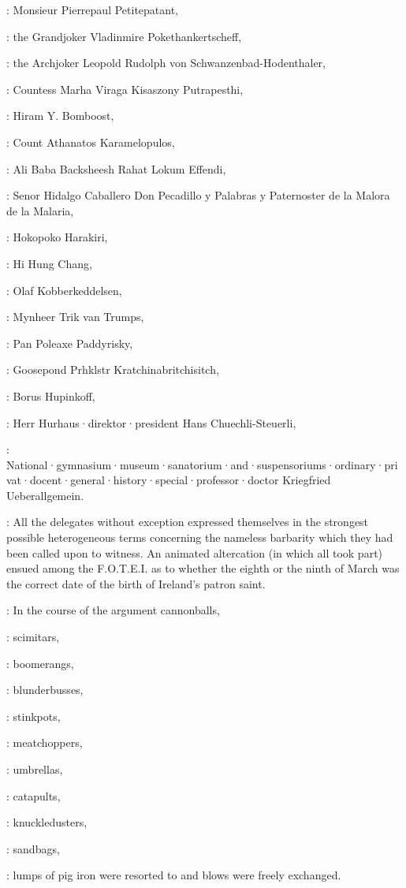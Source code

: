 :
Monsieur Pierrepaul Petitepatant,

:
the Grandjoker Vladinmire Pokethankertscheff,

:
the Archjoker Leopold Rudolph von Schwanzenbad-Hodenthaler,

:
Countess Marha Viraga Kisaszony Putrapesthi,

:
Hiram Y.
Bomboost,

:
Count Athanatos Karamelopulos,

:
Ali Baba Backsheesh Rahat Lokum Effendi,


:
Senor Hidalgo Caballero Don Pecadillo y Palabras y Paternoster de la Malora de la Malaria,


:
Hokopoko Harakiri,


:
Hi Hung Chang,


:
Olaf Kobberkeddelsen,


:
Mynheer Trik van Trumps,


:
Pan Poleaxe Paddyrisky,


:
Goosepond Prhklstr Kratchinabritchisitch,


:
Borus Hupinkoff,


:
Herr Hurhaus·direktor·president Hans Chuechli-Steuerli,


:
National·gymnasium·museum·sanatorium·and·suspensoriums·ordinary·privat·docent·general·history·special·professor·doctor
Kriegfried Ueberallgemein.

:
All the delegates without exception expressed themselves
in the strongest possible heterogeneous terms
concerning the nameless
barbarity which they had been called upon to witness.
An animated
altercation (in which all took part) ensued among the F.O.T.E.I.
as to whether the eighth or the ninth of March was the correct
date of the birth of Ireland's patron saint.

:
In the course of the argument cannonballs,

:
scimitars,

:
boomerangs,


:
blunderbusses,


:
stinkpots,


:
meatchoppers,


:
umbrellas,


:
catapults,


:
knuckledusters,


:
sandbags,


:
lumps of pig iron were resorted to and blows were freely exchanged.

